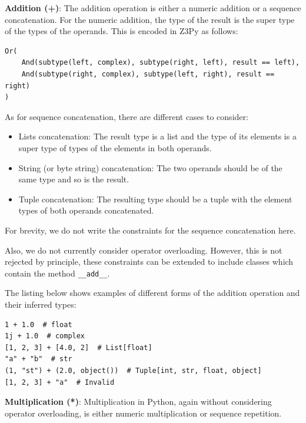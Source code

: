 \textbf{Addition (+)}:
The addition operation is either a numeric addition or a sequence concatenation. For the numeric addition, the type of the result is the super type of the types of the operands. This is encoded in Z3Py as follows:

\begin{lstlisting}
Or(
	And(subtype(left, complex), subtype(right, left), result == left),
	And(subtype(right, complex), subtype(left, right), result == right)
)
\end{lstlisting}

As for sequence concatenation, there are different cases to consider:

\begin{itemize}
	\item Lists concatenation: The result type is a list and the type of its elements is a super type of types of the elements in both operands.
	\item String (or byte string) concatenation: The two operands should be of the same type and so is the result.
	\item Tuple concatenation: The resulting type should be a tuple with the element types of both operands concatenated.
\end{itemize}

For brevity, we do not write the constraints for the sequence concatenation here.

Also, we do not currently consider operator overloading. However, this is not rejected by principle, these constraints can be extended to include classes which contain the method \lstinline|__add__|.

The listing below shows examples of different forms of the addition operation and their inferred types:

\begin{lstlisting}
1 + 1.0  # float
1j + 1.0  # complex
[1, 2, 3] + [4.0, 2]  # List[float]
"a" + "b"  # str
(1, "st") + (2.0, object())  # Tuple[int, str, float, object]
[1, 2, 3] + "a"  # Invalid
\end{lstlisting}

\textbf{Multiplication (*)}:
Multiplication in Python, again without considering operator overloading, is either numeric multiplication or sequence repetition.

